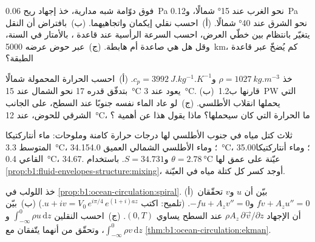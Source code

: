 \begin{exercise}[$\star\star$]\label{exo:b1:ocean-circulation:7}
فوق دوّامة شبه مدارية، خذ إجهاد ريح \qty{0.06}{Pa} نحو الغرب عند \ang{15} شمالًا، و\qty{0.12}{Pa} نحو الشرق عند \ang{40} شمالًا. (أ)~احسب نقلي إيكمان واتجاهيهما. (ب)~بافتراض أن النقل يتغيّر بانتظام بين خطّي العرض، احسب السرعة الرأسية عند قاعدة ، بالأمتار في السنة، وقل هل هي صاعدة أم هابطة. (ج)~عبر حوض عرضه \qty{5000}{km}، كم  يُضخّ عبر قاعدة الطبقة؟
\end{exercise}

\begin{exercise}[$\star\star$]\label{exo:b1:ocean-circulation:8}
خذ $\rho = \qty{1027}{kg.m^{-3}}$ و$c_p = \qty{3992}{J.kg^{-1}.K^{-1}}$. (أ)~احسب الحرارة المحمولة شمالًا بتدفّق قدره \qty{17}{\sverdrup} نحو الشمال عند \qty{15}{\celsius} يعود عند \qty{3}{\celsius}. (ب)~قارنها ب\qty{1.2}{PW} التي يحملها انقلاب الأطلسي. (ج)~لو عاد الماء نفسه جنوبًا عند السطح، على الجانب الشرقي للحوض، عند \qty{12}{\celsius}، ما الحرارة التي كان سيحملها؟ ماذا يقول هذا عن أهمية ؟
\end{exercise}

\begin{exercise}[$\star\star$]\label{exo:b1:ocean-circulation:9}
ثلاث كتل مياه في جنوب الأطلسي لها درجات حرارة كامنة وملوحات: ماء أنتاركتيكا المتوسط \qty{3.3}{\celsius}، 34.15؛ وماء الأطلسي الشمالي العميق \qty{4.0}{\celsius}، 35.00؛ وماء أنتاركتيكا القاعي \qty{0.4}{\celsius}، 34.67. عيّنة على عمق لها $\theta = \qty{2.78}{\celsius}$ و$S = 34.731$. باستخدام \cref{prop:b1:fluid-envelopes-structure:mixing}، أوجد كسر كل كتلة مياه في العيّنة.
\end{exercise}

\begin{exercise}[$\star\star\star$]\label{exo:b1:ocean-circulation:10}
خذ اللولب في \cref{prop:b1:ocean-circulation:spiral}. (أ)~بيّن أن $u$ و$v$ تحقّقان $f v + A_z u'' = 0$ و$-f u + A_z v'' = 0$. (تلميح: اكتب $u + iv =
V_0\,e^{i\pi/4}\,e^{(1+i)az}$.) (ب)~بيّن أن الإجهاد $\rho A_z\,\partial\vec
v/\partial z$ عند السطح يساوي  $(0, T)$. (ج)~احسب النقلين $\int_{-\infty}^0 \rho u\,\mathrm dz$ و$\int_{-\infty}^0 \rho
v\,\mathrm dz$، وتحقّق من أنهما يتّفقان مع \cref{thm:b1:ocean-circulation:ekman}.
\end{exercise}

